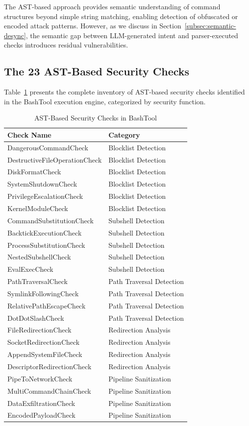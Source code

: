 \documentclass[10pt,conference]{IEEEtran}
\begin{document}
The AST-based approach provides semantic understanding of command structures beyond simple string matching, enabling detection of obfuscated or encoded attack patterns. However, as we discuss in Section~\ref{subsec:semantic-desync}, the semantic gap between LLM-generated intent and parser-executed checks introduces residual vulnerabilities.

\subsection{The 23 AST-Based Security Checks}
\label{subsec:23checks}

Table~\ref{tab:ast-checks} presents the complete inventory of AST-based security checks identified in the BashTool execution engine, categorized by security function.

\begin{table}[htbp]
\caption{AST-Based Security Checks in BashTool}
\label{tab:ast-checks}
\centering
\small
\begin{tabular}{ll}
\toprule
\textbf{Check Name} & \textbf{Category} \\
\midrule
DangerousCommandCheck & Blocklist Detection \\
DestructiveFileOperationCheck & Blocklist Detection \\
DiskFormatCheck & Blocklist Detection \\
SystemShutdownCheck & Blocklist Detection \\
PrivilegeEscalationCheck & Blocklist Detection \\
KernelModuleCheck & Blocklist Detection \\
CommandSubstitutionCheck & Subshell Detection \\
BacktickExecutionCheck & Subshell Detection \\
ProcessSubstitutionCheck & Subshell Detection \\
NestedSubshellCheck & Subshell Detection \\
EvalExecCheck & Subshell Detection \\
PathTraversalCheck & Path Traversal Detection \\
SymlinkFollowingCheck & Path Traversal Detection \\
RelativePathEscapeCheck & Path Traversal Detection \\
DotDotSlashCheck & Path Traversal Detection \\
FileRedirectionCheck & Redirection Analysis \\
SocketRedirectionCheck & Redirection Analysis \\
AppendSystemFileCheck & Redirection Analysis \\
DescriptorRedirectionCheck & Redirection Analysis \\
PipeToNetworkCheck & Pipeline Sanitization \\
MultiCommandChainCheck & Pipeline Sanitization \\
DataExfiltrationCheck & Pipeline Sanitization \\
EncodedPayloadCheck & Pipeline Sanitization \\
\bottomrule
\end{tabular}
\end{table}
\end{document}

